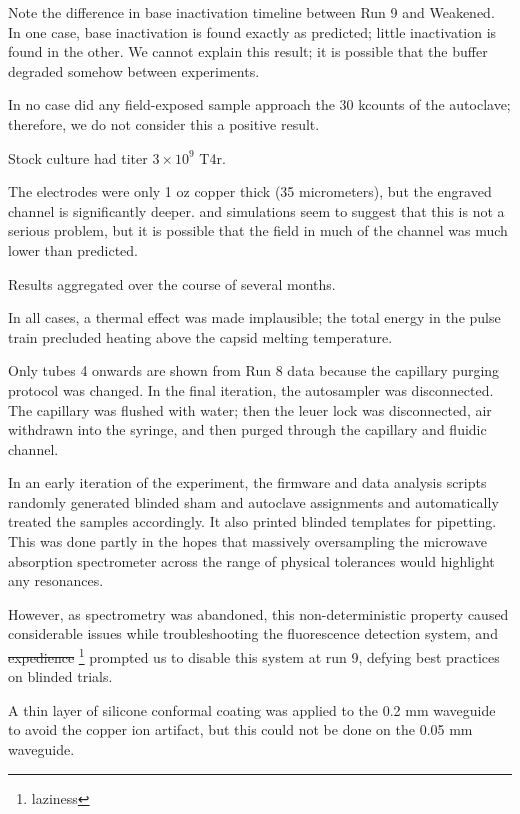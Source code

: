 \documentclass[paper.tex]{subfiles}
\begin{document}
\begin{multicols}{1}
Note the difference in base inactivation timeline between Run 9 and Weakened. In one case, base inactivation is found exactly as predicted; little inactivation is found in the other. We cannot explain this result; it is possible that the buffer degraded somehow between experiments.

In no case did any field-exposed sample approach the 30 kcounts of the autoclave; therefore, we do not consider this a positive result.

Stock culture had titer $3\times 10^9$ T4r.

The electrodes were only 1 oz copper thick (35 micrometers), but the engraved channel is significantly deeper. 
\cite{Nanosecond2006} and simulations seem to suggest that this is not a serious problem, but it is possible that the field in much of the channel was much lower than predicted.

Results aggregated over the course of several months.

In all cases, a thermal effect was made implausible; the total energy in the pulse train precluded heating above the capsid melting temperature\cite{Effects1951}.

Only tubes 4 onwards are shown from Run 8 data because the capillary purging protocol was changed. In the final iteration, the autosampler was disconnected. The capillary was flushed with water; then the leuer lock was disconnected, air withdrawn into the syringe, and then purged through the capillary and fluidic channel.

In an early iteration of the experiment, the firmware and data analysis scripts randomly generated blinded sham and autoclave assignments and automatically treated the samples accordingly. It also printed blinded templates for pipetting. This was done partly in the hopes that massively oversampling the microwave absorption spectrometer across the range of physical tolerances would highlight any resonances.\cite{first2000} 

However, as spectrometry was abandoned, this non-deterministic property caused considerable issues while troubleshooting the fluorescence detection system, and \st{expedience} \footnote{laziness} prompted us to disable this system at run 9, defying best practices on blinded trials.

A thin layer of silicone conformal coating was applied to the 0.2 mm waveguide to avoid the copper ion artifact, but this could not be done on the 0.05 mm waveguide.



\end{multicols}
\end{document}
